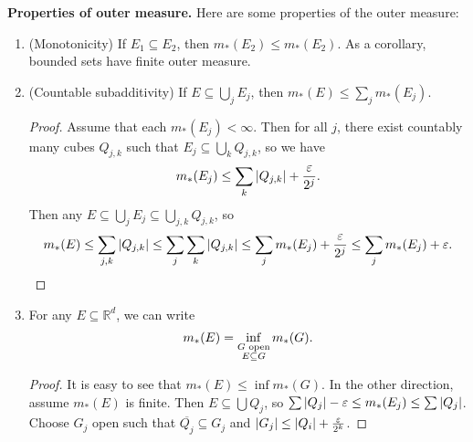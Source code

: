 \documentclass[leqno, openany]{memoir}
\theoremstyle{definition}
\theoremstyle{remark}
\theoremstyle{plain}
\theoremstyle{definition}
\theoremstyle{remark}
\newcommand{\R}{\mathbb{R}}
\newcommand{\ep}{\varepsilon}
\newcommand{\ol}[1]{\overline{#1}}
\begin{document}
\textbf{Properties of outer measure.} Here are some properties of the outer
measure: \begin{enumerate} \item (Monotonicity) If $E_1 \subseteq E_2$, then
    $m_*(E_2) \leq m_*(E_2)$. As a corollary, bounded sets have finite outer
    measure.  \item (Countable subadditivity) If $E \subseteq \bigcup_j E_j$,
    then $m_*(E) \leq \sum_j m_*(E_j)$.  \begin{proof} Assume that each
        $m_*(E_j) < \infty$. Then for all $j$, there exist countably many cubes
        $Q_{j,k}$ such that $E_j \subseteq \bigcup_k Q_{j,k}$, so we have \[
        m_*(E_j) \leq \sum_k \abs{Q_{j,k}} + \frac{\ep}{2^j}. \] Then any $E
        \subseteq \bigcup_j E_j \subseteq \bigcup_{j,k} Q_{j,k}$, so \[ m_*(E)
        \leq \sum_{j,k} \abs{Q_{j,k}} \leq \sum_j \sum_k \abs{Q_{j,k}} \leq
    \sum_j m_*(E_j) + \frac{\ep}{2^j} \leq \sum_j m_*(E_j) + \ep. \qedhere \]
    \end{proof} \item For any $E \subseteq \R^d$, we can write \[ m_*(E) =
    \inf_{\substack{G \text{ open}\\E \subseteq G}} m_*(G). \qedhere \]
    \begin{proof} It is easy to see that $m_*(E) \leq \inf m_*(G)$. In the
        other direction, assume $m_*(E)$ is finite. Then $E \subseteq \bigcup
        Q_j$, so $\sum \abs{Q_j} - \ep \leq m_*(E_j) \leq \sum \abs{Q_j}$.
        Choose $G_j$ open such that $\ol{Q_j} \subseteq G_j$ and $\abs{G_j}
        \leq \abs{Q_i} + \frac{\ep}{2^k}$. 


\end{proof}
\end{enumerate}
\end{document}
